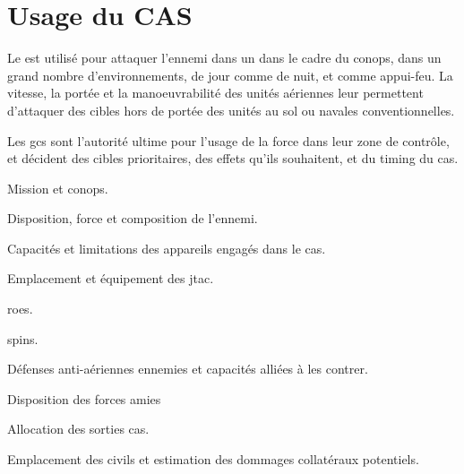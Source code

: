 \section{Usage du CAS}

Le  est utilisé pour attaquer l'ennemi dans un dans le cadre du \gls{conops}, dans un grand nombre d'environnements, de jour comme de nuit, et comme appui-feu. La vitesse, la portée et la manoeuvrabilité des unités aériennes leur permettent d'attaquer des cibles hors de portée des unités au sol ou navales conventionnelles.

Les \glspl{gc} sont l'autorité ultime pour l'usage de la force dans leur zone de contrôle, et décident des cibles prioritaires, des effets qu'ils souhaitent, et du timing du \gls{cas}.

\begin{e1}
	
	
	
	\begin{e2}
		\item Mission et \gls{conops}.
		\item Disposition, force et composition de l'ennemi.
		\item Capacités et limitations des appareils engagés dans le \gls{cas}.
		\item Emplacement et équipement des \gls{jtac}.
		\item \glspl{roe}.
		\item \gls{spins}.
		\item Défenses anti-aériennes ennemies et capacités alliées à les contrer.
		\item Disposition des forces amies
		\item Allocation des sorties \gls{cas}.
		\item Emplacement des civils et estimation des dommages collatéraux potentiels.	
	\end{e2}
	

\end{e1}
